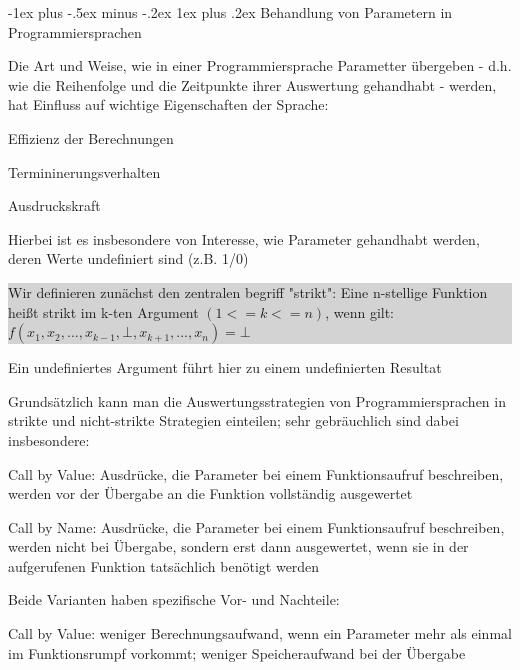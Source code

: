 \documentclass[10pt]{article}
\makeatletter
\renewcommand{\subsubsection}{\@startsection{subsubsection}{3}{0mm}%
                                {-1ex plus -.5ex minus -.2ex}%
                                {1ex plus .2ex}%
                                {\normalfont\small\bfseries}}
\makeatother
\begin{document}
  \subsubsection{Behandlung von Parametern in Programmiersprachen}
  \begin{itemize*}
    \item Die Art und Weise, wie in einer Programmiersprache Parametter übergeben - d.h. wie die Reihenfolge und die Zeitpunkte ihrer Auswertung gehandhabt - werden, hat Einfluss auf wichtige Eigenschaften der Sprache:
    \begin{itemize*}
      \item Effizienz der Berechnungen
      \item Termininerungsverhalten
      \item Ausdruckskraft
    \end{itemize*}
    \item Hierbei ist es insbesondere von Interesse, wie Parameter gehandhabt werden, deren Werte undefiniert sind (z.B. 1/0)\newline
    \colorbox{lightgray}{
      \begin{minipage}[h]{1.0\linewidth}
        Wir definieren zunächst den zentralen begriff "strikt": \newline Eine n-stellige Funktion heißt strikt im k-ten Argument $(1<=k<=n)$, wenn gilt: $f(x_1,x_2,...,x_{k-1},\bot,x_{k+1},...,x_n)=\bot$
      \end{minipage}}
    \item Ein undefiniertes Argument führt hier zu einem undefinierten Resultat
    \item Grundsätzlich kann man die Auswertungsstrategien von Programmiersprachen in strikte und nicht-strikte Strategien einteilen; sehr gebräuchlich sind dabei insbesondere:
    \begin{itemize*}
      \item Call by Value: Ausdrücke, die Parameter bei einem Funktionsaufruf beschreiben, werden vor der Übergabe an die Funktion vollständig ausgewertet
      \item Call by Name: Ausdrücke, die Parameter bei einem Funktionsaufruf beschreiben, werden nicht bei Übergabe, sondern erst dann ausgewertet, wenn sie in der aufgerufenen Funktion tatsächlich benötigt werden
    \end{itemize*}
    \item Beide Varianten haben spezifische Vor- und Nachteile:
    \begin{itemize*}
      \item Call by Value: weniger Berechnungsaufwand, wenn ein Parameter mehr als einmal im Funktionsrumpf vorkommt; weniger Speicheraufwand bei der Übergabe

\end{itemize*}
\end{itemize*}
\end{document}
